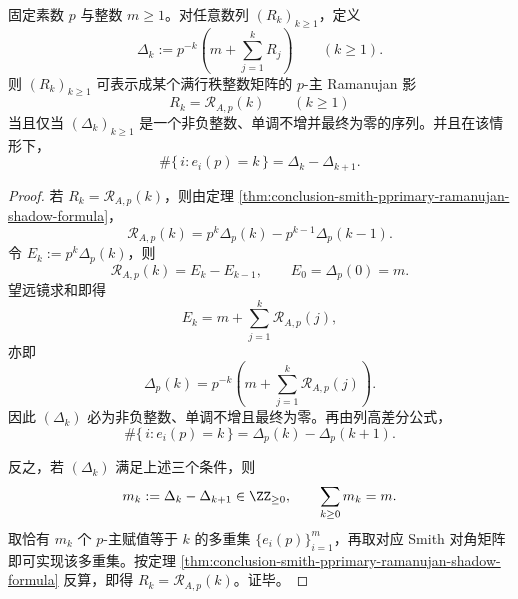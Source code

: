 \begin{theorem}\label{thm:conclusion-smith-pprimary-ramanujan-shadow-inversion}
固定素数 \(p\) 与整数 \(m\ge 1\)。对任意数列 \((R_k)_{k\ge 1}\)，定义
\[
\Delta_k:=p^{-k}\left(m+\sum_{j=1}^{k}R_j\right)
\qquad (k\ge 1).
\]
则 \((R_k)_{k\ge 1}\) 可表示成某个满行秩整数矩阵的 \(p\)-主 Ramanujan 影
\[
R_k=\mathcal R_{A,p}(k)
\qquad (k\ge 1)
\]
当且仅当 \((\Delta_k)_{k\ge 1}\) 是一个非负整数、单调不增并最终为零的序列。并且在该情形下，
\[
\#\{\,i:e_i(p)=k\,\}=\Delta_k-\Delta_{k+1}.
\]
\end{theorem}
\begin{proof}
若 \(R_k=\mathcal R_{A,p}(k)\)，则由定理 \ref{thm:conclusion-smith-pprimary-ramanujan-shadow-formula}，
\[
\mathcal R_{A,p}(k)=p^k\Delta_p(k)-p^{k-1}\Delta_p(k-1).
\]
令 \(E_k:=p^k\Delta_p(k)\)，则
\[
\mathcal R_{A,p}(k)=E_k-E_{k-1},
\qquad
E_0=\Delta_p(0)=m.
\]
望远镜求和即得
\[
E_k=m+\sum_{j=1}^{k}\mathcal R_{A,p}(j),
\]
亦即
\[
\Delta_p(k)=p^{-k}\left(m+\sum_{j=1}^{k}\mathcal R_{A,p}(j)\right).
\]
因此 \((\Delta_k)\) 必为非负整数、单调不增且最终为零。再由列高差分公式，
\[
\#\{\,i:e_i(p)=k\,\}=\Delta_p(k)-\Delta_p(k+1).
\]

反之，若 \((\Delta_k)\) 满足上述三个条件，则
\[
m_k:=\Delta_k-\Delta_{k+1}\in \ZZ_{\ge 0},
\qquad
\sum_{k\ge 0}m_k=m.
\]
取恰有 \(m_k\) 个 \(p\)-主赋值等于 \(k\) 的多重集 \(\{e_i(p)\}_{i=1}^{m}\)，再取对应 Smith 对角矩阵即可实现该多重集。按定理 \ref{thm:conclusion-smith-pprimary-ramanujan-shadow-formula} 反算，即得 \(R_k=\mathcal R_{A,p}(k)\)。证毕。
\end{proof}

